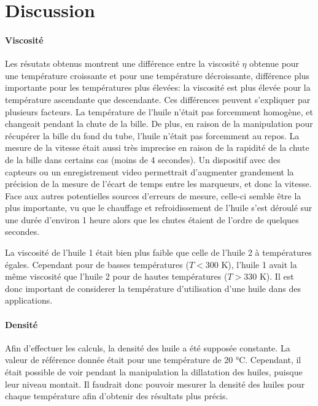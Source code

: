 \section{Discussion}

\paragraph{Viscosité} Les résutats obtenus montrent une différence entre la viscosité \(\eta\) obtenue pour une température croissante et pour une température décroissante, différence plus importante pour les températures plus élevées: la viscosité est plus élevée pour la température ascendante que descendante. Ces différences peuvent s'expliquer par plusieurs facteurs. La température de l'huile n'était pas forcemment homogène, et changeait pendant la chute de la bille. De plus, en raison de la manipulation pour récupérer la bille du fond du tube, l'huile n'était pas forcemment au repos. La mesure de la vitesse était aussi très imprecise en raison de la rapidité de la chute de la bille dans certains cas (moins de 4 secondes). Un dispositif avec des capteurs ou un enregistrement video permettrait d'augmenter grandement la précision de la mesure de l'écart de temps entre les marqueurs, et donc la vitesse. Face aux autres potentielles sources d'erreurs de mesure, celle-ci semble être la plus importante, vu que le chauffage et refroidissement de l'huile s'est déroulé sur une durée d'environ 1 heure alors que les chutes étaient de l'ordre de quelques secondes.

La viscosité de l'huile 1 était bien plus faible que celle de l'huile 2 à températures égales. Cependant pour de basses températures (\(T < 300\) \si{\kelvin}), l'huile 1 avait la même viscosité que l'huile 2 pour de hautes températures (\(T > 330\) \si{\kelvin}). Il est donc important de considerer la température d'utilisation d'une huile dans des applications.

\paragraph{Densité} Afin d'effectuer les calculs, la densité des huile a été supposée constante. La valeur de référence donnée était pour une température de 20 \si{\celsius}. Cependant, il était possible de voir pendant la manipulation la dillatation des huiles, puisque leur niveau montait. Il faudrait donc pouvoir mesurer la densité des huiles pour chaque température afin d'obtenir des résultats plus précis.



